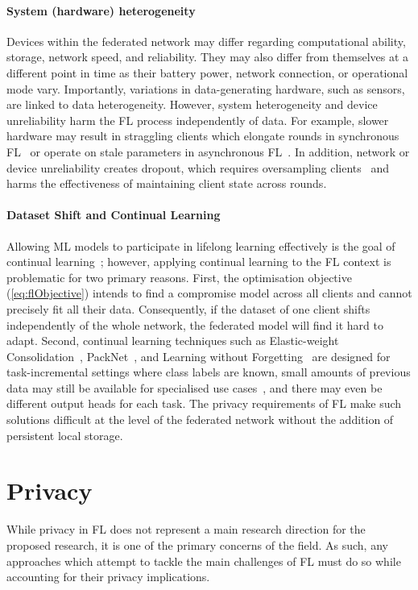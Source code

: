 \paragraph{System (hardware) heterogeneity} Devices within the federated network may differ regarding computational ability, storage, network speed, and reliability. They may also differ from themselves at a different point in time as their battery power, network connection, or operational mode vary. Importantly, variations in data-generating hardware, such as sensors, are linked to data heterogeneity. However, system heterogeneity and device unreliability harm the FL process independently of data. For example, slower hardware may result in straggling clients which elongate rounds in synchronous FL~\citep{ScaleSystemDesign,FedProx} or operate on stale parameters in asynchronous FL~\citep{AsyncFedOpt,PAPAYA}\@. In addition, network or device unreliability creates dropout, which requires oversampling clients~\cite{ScaleSystemDesign} and harms the effectiveness of maintaining client state across rounds.

\paragraph{Dataset Shift and Continual Learning}  Allowing ML models to participate in lifelong learning effectively is the goal of continual learning~\citep{ContinualLearningSurvey}; however, applying continual learning to the FL context is problematic for two primary reasons. First, the optimisation objective (\cref{eq:flObjective}) intends to find a compromise model across all clients and cannot precisely fit all their data. Consequently, if the dataset of one client shifts independently of the whole network, the federated model will find it hard to adapt. Second, continual learning techniques such as Elastic-weight Consolidation~\citep{kirkpatrick2017overcoming},  PackNet~\citep{PackNetAM}, and Learning without Forgetting~\citep{LearningWithoutForgetting} are designed for task-incremental settings where class labels are known, small amounts of previous data may still be available for specialised use cases~\citep{kirkpatrick2017overcoming}, and there may even be different output heads for each task. The privacy requirements of FL make such solutions difficult at the level of the federated network without the addition of persistent local storage.
\section{Privacy}
While privacy in FL does not represent a main research direction for the proposed research, it is one of the primary concerns of the field. As such, any approaches which attempt to tackle the main challenges of FL must do so while accounting for their privacy implications.

